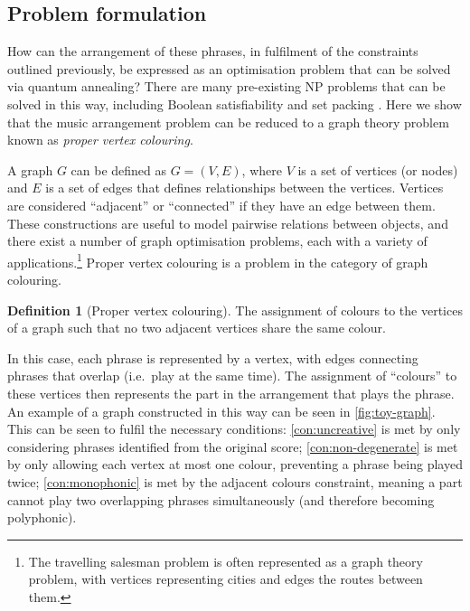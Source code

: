 \documentclass[12pt]{article}
\theoremstyle{definition}
\newtheorem*{definition}{Definition}
\begin{document}
\subsection{Problem formulation}

How can the arrangement of these phrases, in fulfilment of the constraints outlined previously, be expressed as an optimisation problem that can be solved via quantum annealing? There are many pre-existing NP problems that can be solved in this way, including Boolean satisfiability and set packing \cite{lucas_ising_2014}. Here we show that the music arrangement problem can be reduced to a graph theory problem known as \emph{proper vertex colouring}.

A graph $G$ can be defined as $G=(V,E)$, where $V$ is a set of vertices (or nodes) and $E$ is a set of edges that defines relationships between the vertices. Vertices are considered ``adjacent'' or ``connected'' if they have an edge between them. These constructions are useful to model pairwise relations between objects, and there exist a number of graph optimisation problems, each with a variety of applications.\footnote{The travelling salesman problem is often represented as a graph theory problem, with vertices representing cities and edges the routes between them.} Proper vertex colouring is a problem in the category of graph colouring.

\begin{definition}[Proper vertex colouring]
    The assignment of colours to the vertices of a graph such that no two adjacent vertices share the same colour.
\end{definition}

In this case, each phrase is represented by a vertex, with edges connecting phrases that overlap (i.e.\ play at the same time). The assignment of ``colours'' to these vertices then represents the part in the arrangement that plays the phrase. An example of a graph constructed in this way can be seen in \cref{fig:toy-graph}. This can be seen to fulfil the necessary conditions: \cref{con:uncreative} is met by only considering phrases identified from the original score; \cref{con:non-degenerate} is met by only allowing each vertex at most one colour, preventing a phrase being played twice; \cref{con:monophonic} is met by the adjacent colours constraint, meaning a part cannot play two overlapping phrases simultaneously (and therefore becoming polyphonic). 
\end{document}
